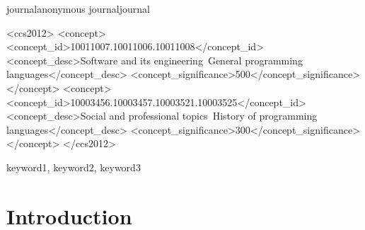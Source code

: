 \documentclass[conference]{IEEEtran}
\def\acmversionanonymous{anonymous}
\def\acmversionjournal{journal}
\def\acmversion{none}
\def\acmversion{anonymous}
\def\acmversion{journal}
\begin{document}
\ifx\acmversion\acmversionanonymous
{} %
\renewcommand\footnotetextcopyrightpermission[1]{} %
\fi
\ifx\acmversion\acmversionjournal
\begin{CCSXML}
<ccs2012>
<concept>
<concept_id>10011007.10011006.10011008</concept_id>
<concept_desc>Software and its engineering~General programming languages</concept_desc>
<concept_significance>500</concept_significance>
</concept>
<concept>
<concept_id>10003456.10003457.10003521.10003525</concept_id>
<concept_desc>Social and professional topics~History of programming languages</concept_desc>
<concept_significance>300</concept_significance>
</concept>
</ccs2012>
\end{CCSXML}


\fi

\maketitle
\ifx\grammarly\grammarlyon 
\onecolumn 
\else 
\fi

\ifx\paperversion\paperversioncameraIEEE
  \makeabstract
  \begin{IEEEkeywords}
    keyword1, keyword2, keyword3  %
  \end{IEEEkeywords}
\fi

\section{Introduction}
\end{document}
